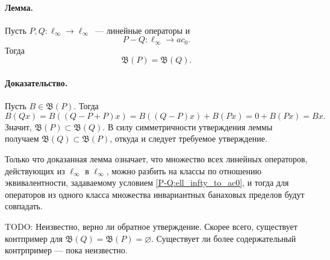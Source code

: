 \paragraph{Лемма.}

Пусть $P,Q:\ell_\infty \to \ell_\infty$~--- линейные операторы и
\begin{equation}\label{P-Q:ell_infty_to_ac0}
	P-Q : \ell_\infty \to ac_0
	.
\end{equation}
Тогда
\begin{equation}
	\mathfrak{B}(P)=\mathfrak{B}(Q)
	.
\end{equation}

\paragraph{Доказательство.}
Пусть $B\in \mathfrak{B}(P)$.
Тогда
\begin{equation}
	B(Qx) = B((Q-P+P)x) =
	B((Q-P)x)+B(Px) =
	0 + B(Px) =
	Bx
	.
\end{equation}
Значит, $\mathfrak{B}(P) \subset \mathfrak{B}(Q)$.
В силу симметричности утверждения леммы получаем $\mathfrak{B}(Q) \subset \mathfrak{B}(P)$,
откуда и следует требуемое утверждение.

Только что доказанная лемма означает, что множество всех линейных операторов,
действующих из $\ell_\infty$ в $\ell_\infty$, можно разбить на классы по отношению эквивалентности,
задаваемому условием \eqref{P-Q:ell_infty_to_ac0},
и тогда для операторов из одного класса множества инвариантных банаховых пределов будут совпадать.

TODO:
Неизвестно, верно ли обратное утверждение.
Скорее всего, существует контпример для $\mathfrak{B}(Q) = \mathfrak{B}(P) = \varnothing$.
Существует ли более содержательный контрпример --- пока неизвестно.

